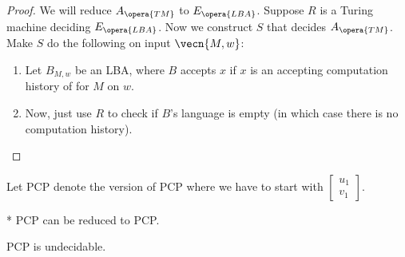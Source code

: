 \begin{proof}
	We will reduce $A_{\opera{TM}}$ to $E_{\opera{LBA}}$. Suppose $R$ is a Turing machine deciding $E_{\opera{LBA}}$. Now we construct $S$ that decides $A_{\opera{TM}}$. Make $S$ do the following on input $\vecn{M,w}$:
	\begin{enumerate}
		\item Let $B_{M,w}$ be an LBA, where $B$ accepts $x$ if $x$ is an accepting computation history of for $M$ on $w$.
		\item Now, just use $R$ to check if $B$'s language is empty (in which case there is no computation history).
	\end{enumerate}	
\end{proof}


\begin{defn}
	Let PCP denote the version of PCP where we have to start with $\begin{bmatrix} u_1 \\ v_1 \end{bmatrix}$.
\end{defn}

\begin{fact}*
	PCP can be reduced to PCP.
\end{fact}

\begin{thm}
	PCP is undecidable.
\end{thm}

